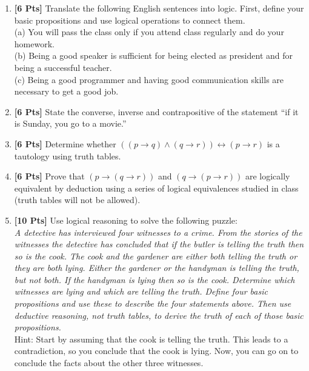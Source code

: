 \begin{enumerate}

\item {\bf [6 Pts]} Translate the following English sentences into logic. First, define your basic propositions and use logical operations to connect them.\\
        (a) You will pass the class only if you attend class regularly and do your homework.\\
        (b) Being a good speaker is sufficient for being elected as president and for being a successful teacher.\\
				(c) Being a good programmer and having good communication skills are necessary to get a good job. 
				
\item {\bf [6 Pts]} State the converse, inverse and contrapositive of  the statement ``if it is Sunday, you go to a movie.''				
				
\item {\bf [6 Pts]} Determine whether $((p \rightarrow q) \wedge (q \rightarrow r)) \leftrightarrow (p \rightarrow r)$ is a tautology using truth tables.

\item {\bf [6 Pts]} Prove that $(p \rightarrow (q \rightarrow r))$ and $(q \rightarrow (p \rightarrow r))$ are logically equivalent by deduction using a series of logical equivalences studied in class (truth tables will not be allowed).

\item {\bf [10 Pts]} Use logical reasoning to solve the following puzzle:
\\
{\it A detective has interviewed four witnesses to a crime. From the stories of the witnesses the detective has concluded that if the butler is telling the truth then so is the cook. The cook and the gardener are either both telling the truth or they are both lying. Either the gardener or the handyman is telling the truth, but not both. If the handyman is lying then so is the cook. Determine which witnesses are lying and which are telling the truth. Define four basic propositions and use these to describe the four statements above. Then use deductive reasoning, not truth tables, to derive the truth of each of those basic propositions.
}\\
Hint: Start by assuming that the cook is telling the truth. This leads to a contradiction, so you conclude that the cook is lying. Now, you can go on to conclude the facts about the other three witnesses.


\end{enumerate}
